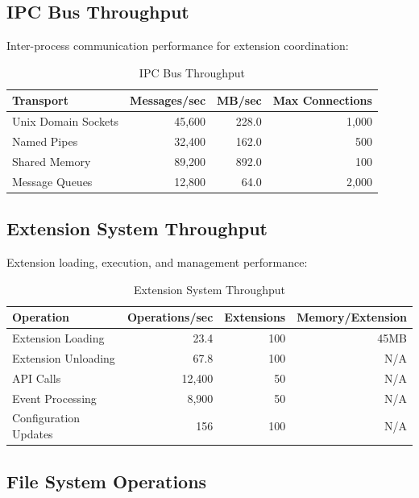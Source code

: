 \subsection*{IPC Bus Throughput}

Inter-process communication performance for extension coordination:

\begin{table}[ht]
\centering
\caption{IPC Bus Throughput}
\label{tab:ipc-throughput}
\begin{tabular}{@{}lrrr@{}}
\toprule
\textbf{Transport} & \textbf{Messages/sec} & \textbf{MB/sec} & \textbf{Max Connections} \\
\midrule
Unix Domain Sockets & 45,600 & 228.0 & 1,000 \\
Named Pipes & 32,400 & 162.0 & 500 \\
Shared Memory & 89,200 & 892.0 & 100 \\
Message Queues & 12,800 & 64.0 & 2,000 \\
\bottomrule
\end{tabular}
\end{table}

\subsection*{Extension System Throughput}

Extension loading, execution, and management performance:

\begin{table}[ht]
\centering
\caption{Extension System Throughput}
\label{tab:extension-throughput}
\begin{tabular}{@{}lrrr@{}}
\toprule
\textbf{Operation} & \textbf{Operations/sec} & \textbf{Extensions} & \textbf{Memory/Extension} \\
\midrule
Extension Loading & 23.4 & 100 & 45MB \\
Extension Unloading & 67.8 & 100 & N/A \\
API Calls & 12,400 & 50 & N/A \\
Event Processing & 8,900 & 50 & N/A \\
Configuration Updates & 156 & 100 & N/A \\
\bottomrule
\end{tabular}
\end{table}

\subsection*{File System Operations}


